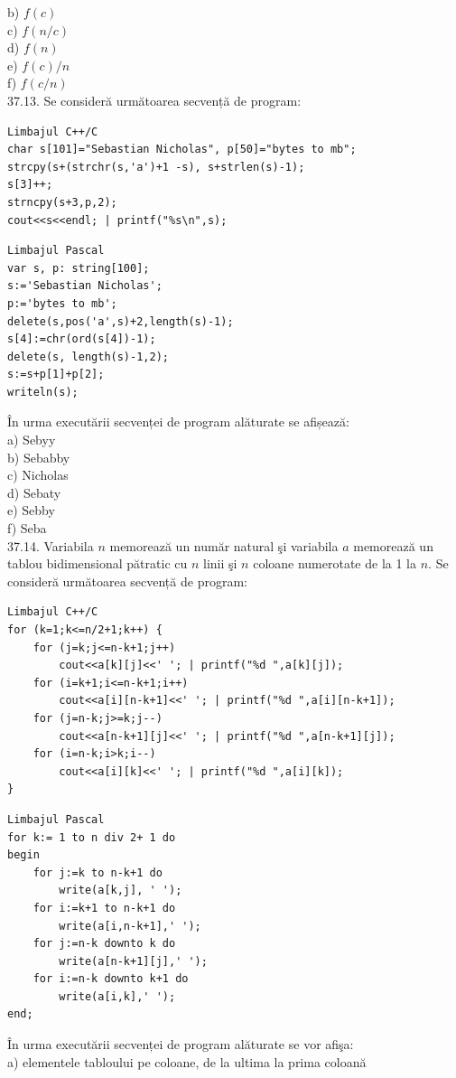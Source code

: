 \begin{itemize}
\begin{enumerate}
b) $f(c)$
\\
c) $f(n / c)$
\\
d) $f(n)$
\\
e) $f(c) / n$
\\
f) $f(c / n)$
\\
37.13. Se consideră următoarea secvență de program:
\begin{verbatim}
Limbajul C++/C
char s[101]="Sebastian Nicholas", p[50]="bytes to mb";
strcpy(s+(strchr(s,'a')+1 -s), s+strlen(s)-1);
s[3]++;
strncpy(s+3,p,2);
cout<<s<<endl; | printf("%s\n",s);
\end{verbatim}
\begin{verbatim}
Limbajul Pascal
var s, p: string[100];
s:='Sebastian Nicholas';
p:='bytes to mb';
delete(s,pos('a',s)+2,length(s)-1);
s[4]:=chr(ord(s[4])-1);
delete(s, length(s)-1,2);
s:=s+p[1]+p[2];
writeln(s);
\end{verbatim}
În urma executării secvenței de program alăturate se afișează:
\\
a) Sebyy
\\
b) Sebabby
\\
c) Nicholas
\\
d) Sebaty
\\
e) Sebby
\\
f) Seba
\\
37.14. Variabila $n$ memorează un număr natural şi variabila $a$ memorează un tablou bidimensional pătratic cu $n$ linii şi $n$ coloane numerotate de la 1 la $n$. Se consideră următoarea secvență de program:
\begin{verbatim}
Limbajul C++/C
for (k=1;k<=n/2+1;k++) {
    for (j=k;j<=n-k+1;j++)
        cout<<a[k][j]<<' '; | printf("%d ",a[k][j]);
    for (i=k+1;i<=n-k+1;i++)
        cout<<a[i][n-k+1]<<' '; | printf("%d ",a[i][n-k+1]);
    for (j=n-k;j>=k;j--)
        cout<<a[n-k+1][j]<<' '; | printf("%d ",a[n-k+1][j]);
    for (i=n-k;i>k;i--)
        cout<<a[i][k]<<' '; | printf("%d ",a[i][k]);
}
\end{verbatim}
\begin{verbatim}
Limbajul Pascal
for k:= 1 to n div 2+ 1 do
begin
    for j:=k to n-k+1 do
        write(a[k,j], ' ');
    for i:=k+1 to n-k+1 do
        write(a[i,n-k+1],' ');
    for j:=n-k downto k do
        write(a[n-k+1][j],' ');
    for i:=n-k downto k+1 do
        write(a[i,k],' ');
end;
\end{verbatim}
În urma executării secvenței de program alăturate se vor afişa:
\\
a) elementele tabloului pe coloane, de la ultima la prima coloană

\end{enumerate}
\end{itemize}
